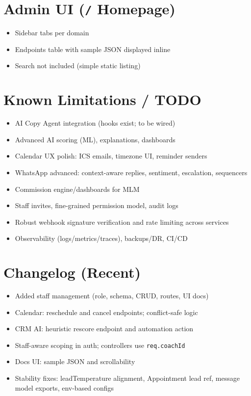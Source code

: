 \documentclass[11pt,a4paper]{article}
\begin{document}
\section{Admin UI (\texttt{/} Homepage)}
\begin{itemize}[noitemsep]
  \item Sidebar tabs per domain
  \item Endpoints table with sample JSON displayed inline
  \item Search not included (simple static listing)
\end{itemize}

\section{Known Limitations / TODO}
\begin{itemize}
  \item AI Copy Agent integration (hooks exist; to be wired)
  \item Advanced AI scoring (ML), explanations, dashboards
  \item Calendar UX polish: ICS emails, timezone UI, reminder senders
  \item WhatsApp advanced: context-aware replies, sentiment, escalation, sequencers
  \item Commission engine/dashboards for MLM
  \item Staff invites, fine-grained permission model, audit logs
  \item Robust webhook signature verification and rate limiting across services
  \item Observability (logs/metrics/traces), backups/DR, CI/CD
\end{itemize}

\section{Changelog (Recent)}
\begin{itemize}
  \item Added staff management (role, schema, CRUD, routes, UI docs)
  \item Calendar: reschedule and cancel endpoints; conflict-safe logic
  \item CRM AI: heuristic rescore endpoint and automation action
  \item Staff-aware scoping in auth; controllers use \texttt{req.coachId}
  \item Docs UI: sample JSON and scrollability
  \item Stability fixes: leadTemperature alignment, Appointment lead ref, message model exports, env-based configs
\end{itemize}
\end{document}
